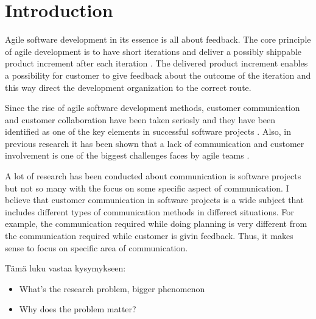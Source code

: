 \documentclass[english,12pt,a4paper,pdftex]{article}
\begin{document}
\clearpage

\section{Introduction}

Agile software development in its essence is all about feedback. The core principle of agile development is to have short iterations and deliver a possibly shippable product increment after each iteration \citep{schwaber2009agile}. The delivered product increment enables a possibility for customer to give feedback about the outcome of the iteration and this way direct the development organization to the correct route.

Since the rise of agile software development methods, customer communication and customer collaboration have been taken seriosly and they have been identified as one of the key elements in successful software projects \citep{agilemanifesto}. Also, in previous research it has been shown that a lack of communication and customer involvement is one of the biggest challenges faces by agile teams \citep{korkala2006}.

A lot of research has been conducted about communication is software projects but not so many with the focus on some specific aspect of communication. I believe that customer communication in software projects is a wide subject that includes different types of communication methods in differect situations. For example, the communication required while doing planning is very different from the communication required while customer is givin feedback. Thus, it makes sense to focus on specific area of communication.

Tämä luku vastaa kysymykseen:

\begin{itemize}
\item What's the research problem, bigger phenomenon
\item Why does the problem matter?
\end{itemize}

\thispagestyle{empty}



\end{document}
